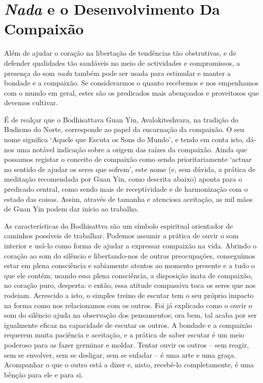 \chapter{\emph{Nada} e o Desenvolvimento Da Compaixão}

Além de ajudar o coração na libertação de tendências tão obstrutivas, e
de defender qualidades tão saudáveis no meio de actividades e
compromissos, a presença do som \emph{nada} também pode ser usada para
estimular e manter a bondade e a compaixão. Se considerarmos o quanto
recebemos e nos empenhamos com o mundo em geral, estes são os predicados
mais abençoados e proveitosos que devemos cultivar.

É de realçar que o Bodhisattava Guan Yin, Avalokiteshvara, na tradição
do Budismo do Norte, corresponde ao papel da encarnação da compaixão. O
seu nome significa `Aquele que Escuta os Sons do Mundo', e tendo em
conta isto, dá-nos uma notável indicação sobre a origem das raízes da
compaixão. Ainda que possamos registar o conceito de compaixão como
sendo prioritariamente `actuar no sentido de ajudar os seres que
sofrem', este nome (e, sem dúvida, a prática de meditação recomendada
por Guan Yin, como descrita abaixo) aponta para o predicado central,
como sendo mais de receptividade e de harmonização com o estado das
coisas. Assim, através de tamanha e atenciosa aceitação, as mil mãos de
Guan Yin podem dar início ao trabalho.

As características do Bodhisattva são um símbolo espiritual orientador
de caminhos possíveis de trabalhar. Podemos assumir a prática de ouvir o
som interior e usá-lo como forma de ajudar a expressar compaixão na
vida. Abrindo o coração ao som do silêncio e libertando-nos de outras
preocupações, conseguimos estar em plena consciência e sabiamente
atentos ao momento presente e a tudo o que ele contém; usando essa plena
consciência, a disposição inata de compaixão, no coração puro, desperta:
e então, essa atitude compassiva toca os seres que nos rodeiam.
Acrescido a isto, o simples treino de escutar tem o seu próprio impacto
na forma como nos relacionamos com os outros. Foi já explicado como o
ouvir o som do silêncio ajuda na observação dos pensamentos; ora bem,
tal acaba por ser igualmente eficaz na capacidade de escutar os outros.
A bondade e a compaixão requerem muita paciência e aceitação, e a
prática de saber escutar é um meio poderoso para as fazer germinar e
moldar. Tentar ouvir os outros -- sem reagir, sem se envolver, sem se
desligar, sem se enfadar -- é uma arte e uma graça. Acompanhar o que o
outro está a dizer e, nisto, recebê-lo completamente, é uma bênção para
ele e para si.

